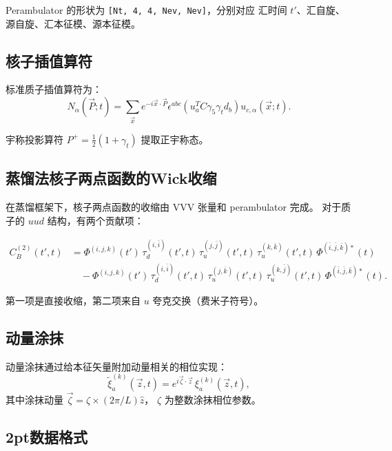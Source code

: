 \documentclass[12pt,a4paper]{ctexart}
\begin{document}
Perambulator 的形状为 \texttt{[Nt, 4, 4, Nev, Nev]}，分别对应
汇时间 $t'$、汇自旋、源自旋、汇本征模、源本征模。

\subsection{核子插值算符}

标准质子插值算符为\cite{关联函数}：
\begin{equation}\label{eq:nucleon_interp}
N_{\alpha}(\vec{P}; t) = \sum_{\vec{x}} e^{-i\vec{x}\cdot\vec{P}}
    \epsilon^{abc} (u^{T}_a C\gamma_5\gamma_t d_b) u_{c,\alpha}(\vec{x}; t).
\end{equation}

宇称投影算符 $P^{+} = \frac{1}{2}(1 + \gamma_t)$ 提取正宇称态。

\subsection{蒸馏法核子两点函数的Wick收缩}

在蒸馏框架下，核子两点函数的收缩由 VVV 张量和 perambulator 完成。
对于质子的 $uud$ 结构，有两个贡献项\cite{蒸馏方法}：

\begin{align}
C^{(2)}_{B}(t', t) &= \Phi^{(i,j,k)}(t')
    \, \tau^{(i,\bar{i})}_{d}(t',t)
    \, \tau^{(j,\bar{j})}_{u}(t',t)
    \, \tau^{(k,\bar{k})}_{u}(t',t)
    \, \Phi^{(\bar{i},\bar{j},\bar{k})*}(t) \\
    &\quad - \Phi^{(i,j,k)}(t')
    \, \tau^{(i,\bar{i})}_{d}(t',t)
    \, \tau^{(j,\bar{k})}_{u}(t',t)
    \, \tau^{(k,\bar{j})}_{u}(t',t)
    \, \Phi^{(\bar{i},\bar{j},\bar{k})*}(t). \nonumber
\end{align}

第一项是直接收缩，第二项来自 $u$ 夸克交换（费米子符号）。

\subsection{动量涂抹}

动量涂抹通过给本征矢量附加动量相关的相位实现\cite{distillation}：
\begin{equation}\label{eq:mom_smear}
\tilde{\xi}^{(k)}_{a}(\vec{z}, t) = e^{i\vec{\zeta}\cdot\vec{z}}
    \, \xi^{(k)}_{a}(\vec{z}, t),
\end{equation}
其中涂抹动量 $\vec{\zeta} = \zeta \times (2\pi/L)\hat{z}$，
$\zeta$ 为整数涂抹相位参数。

\subsection{2pt数据格式}
\end{document}
